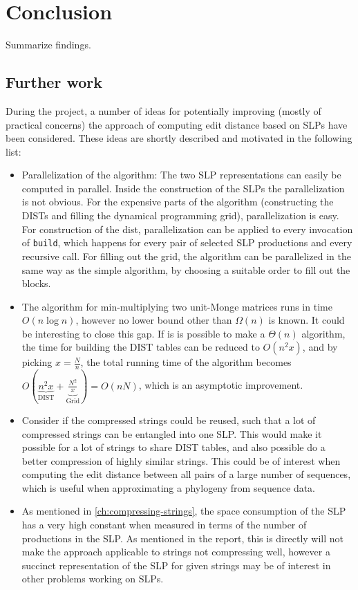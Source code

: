 \documentclass[twoside,11pt,openright]{report}
\newcommand{\DIST}{\operatorname{DIST}}
\begin{document}
\chapter{Conclusion}
\label{chapter:conclusion}
Summarize findings.

\section{Further work}
\label{sec:conclusion:further-work}
During the project, a number of ideas for potentially improving (mostly of practical concerns) the approach of computing edit distance based on SLPs have been considered. These ideas are shortly described and motivated in the following list:

\begin{itemize}
  \item Parallelization of the algorithm: The two SLP representations can easily be computed in parallel. Inside the construction of the SLPs the parallelization is not obvious.
  For the expensive parts of the algorithm (constructing the DISTs and filling the dynamical programming grid), parallelization is easy. For construction of the dist, parallelization can be applied to every invocation of \texttt{build}, which happens for every pair of selected SLP productions and every recursive call.
  For filling out the grid, the algorithm can be parallelized in the same way as the simple algorithm, by choosing a suitable order to fill out the blocks.

  \item The algorithm for min-multiplying two unit-Monge matrices runs in time $O(n \log{n})$, however no lower bound other than $\Omega(n)$ is known. It could be interesting to close this gap. If is is possible to make a $\Theta(n)$ algorithm, the time for building the DIST tables can be reduced to $O(n^2 x)$, and by picking $x = \frac{N}{n}$, the total running time of the algorithm becomes $O(\underbrace{n^2 x}_{\DIST} + \underbrace{\frac{N^2}{x}}_{\text{Grid}}) = O(nN)$, which is an asymptotic improvement.

  \item Consider if the compressed strings could be reused, such that a lot of compressed strings can be entangled into one SLP. This would make it possible for a lot of strings to share DIST tables, and also possible do a better compression of highly similar strings. This could be of interest when computing the edit distance between all pairs of a large number of sequences, which is useful when approximating a phylogeny from sequence data.

  \item As mentioned in \cref{ch:compressing-strings}, the space consumption of the SLP has a very high constant when measured in terms of the number of productions in the SLP. As mentioned in the report, this is directly will not make the approach applicable to strings not compressing well, however a succinct representation of the SLP for given strings may be of interest in other problems working on SLPs.
\end{itemize}
\end{document}
